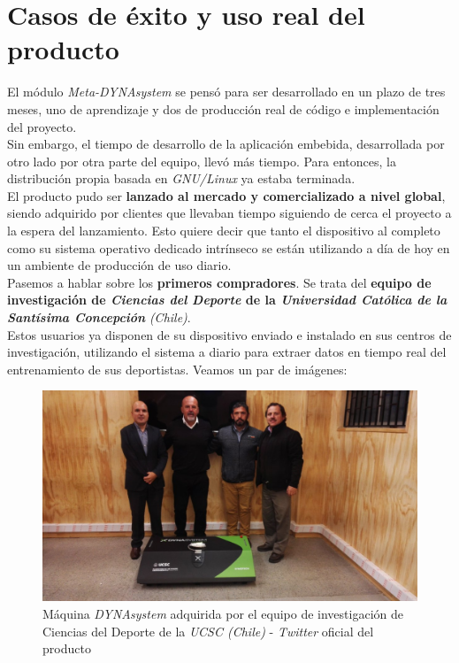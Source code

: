 \chapter{Casos de éxito y uso real del producto}

El módulo \textit{Meta-DYNAsystem} se pensó para ser desarrollado en un plazo de tres meses, uno de aprendizaje y dos de producción real de código e implementación del proyecto.\\

Sin embargo, el tiempo de desarrollo de la aplicación embebida, desarrollada por otro lado por otra parte del equipo, llevó más tiempo. Para entonces, la distribución propia basada en \textit{GNU/Linux} ya estaba terminada.\\

El producto pudo ser \textbf{lanzado al mercado y comercializado a nivel global}, siendo adquirido por clientes que llevaban tiempo siguiendo de cerca el proyecto a la espera del lanzamiento. Esto quiere decir que tanto el dispositivo al completo como su sistema operativo dedicado intrínseco se están utilizando a día de hoy en un ambiente de producción de uso diario.\\

Pasemos a hablar sobre los \textbf{primeros compradores}. Se trata del \textbf{equipo de investigación de \textit{Ciencias del Deporte} de la \textit{Universidad Católica de la Santísima Concepción}} \textit{(Chile)}.\\

Estos usuarios ya disponen de su dispositivo enviado e instalado en sus centros de investigación, utilizando el sistema a diario para extraer datos en tiempo real del entrenamiento de sus deportistas. Veamos un par de imágenes:

\begin{figure}[H]
	\centering
	\includegraphics[width=0.9\linewidth]{imagenes/dynasystem-ucsc.jpg}
	\caption{Máquina \textit{DYNAsystem} adquirida por el equipo de investigación de Ciencias del Deporte de la \textit{UCSC (Chile)} - \textit{Twitter} oficial del producto \cite{dynasystem-ucsc}}
	\label{dynasystem-ucsc}
\end{figure}


